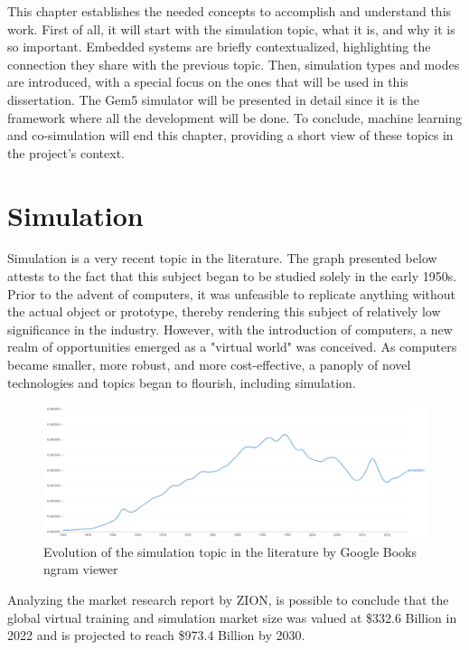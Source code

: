 
This chapter establishes the needed concepts to accomplish and understand this work. First of all, it will start with the simulation topic, what 
it is, and why it is so important. Embedded systems are briefly contextualized, highlighting the connection they share with 
the previous topic. Then, simulation types and modes are introduced, with a special focus on the ones that will be used in this dissertation. 
The Gem5 simulator will be presented in detail since it is the framework where all the development will be done. To conclude, machine learning 
and co-simulation will end this chapter, providing a short view of these topics in the project's context.


\section{Simulation}

Simulation is a very recent topic in the literature. The graph presented below attests to the fact that this subject began to be studied solely 
in the early 1950s. Prior to the advent of computers, it was unfeasible to replicate anything without the actual object or prototype, thereby 
rendering this subject of relatively low significance in the industry. However, with the introduction of computers, a new realm of opportunities 
emerged as a "virtual world" was conceived. As computers became smaller, more robust, and more cost-effective, a panoply of novel technologies 
and topics began to flourish, including simulation. 

\begin{figure}[H]
	\centering
 	\includegraphics[width=0.7\linewidth]{Images/simulation_evolution_graph.png}
 	\caption{Evolution of the simulation topic in the literature by Google Books ngram viewer}
	 \label{fig_simulation_evolution_graph}
\end{figure}

Analyzing the market research report by ZION, is possible to conclude that the global virtual training and simulation market size was valued 
at \$332.6 Billion in 2022 and is projected to reach \$973.4 Billion by 2030.  

